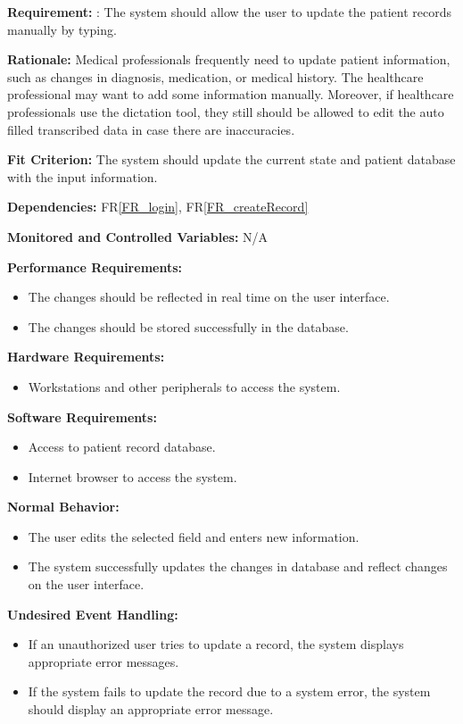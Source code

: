 \documentclass[12pt]{article}
\begin{document}
\begin{itemize}
\textbf{Requirement:} : The system should allow the user to update the patient records manually by typing.

\textbf{Rationale:} Medical professionals frequently need to update patient information, such as changes in diagnosis, medication, or medical history. The healthcare professional may want to add some information manually. Moreover, if healthcare professionals use the dictation tool, they still should be allowed to edit the auto filled transcribed data in case there are inaccuracies.

\textbf{Fit Criterion:} The system should update the current state and patient database with the input information.

\textbf{Dependencies:} FR\ref{FR_login}, FR\ref{FR_createRecord}

\textbf{Monitored and Controlled Variables:} N/A

\textbf{Performance Requirements:} 
\begin{itemize}
  \item The changes should be reflected in real time on the user interface.
  \item The changes should be stored successfully in the database.
\end{itemize}

\textbf{Hardware Requirements:} 
\begin{itemize}
  \item Workstations and other peripherals to access the system.
\end{itemize}

\textbf{Software Requirements:} 
\begin{itemize}
  \item Access to patient record database.
  \item Internet browser to access the system. 
\end{itemize}

\textbf{Normal Behavior:} 
\begin{itemize}
  \item The user edits the selected field and enters new information. 
  \item The system successfully updates the changes in database and reflect changes on the user interface. 
\end{itemize}

\textbf{Undesired Event Handling:}
\begin{itemize}
  \item If an unauthorized user tries to update a record, the system displays appropriate error messages. 
  \item If the system fails to update the record due to a system error, the system should display an appropriate error message. 
\end{itemize}


\end{itemize}
\end{document}
